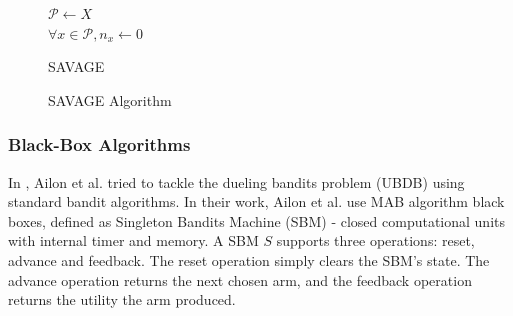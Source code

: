 \documentclass{llncs}
\begin{document}
\begin{figure}[h]
	\IncMargin{1em}
		\begin{algorithm}[H]
		
			$ \mathcal{P} \leftarrow X $\\
			$ \forall x \in \mathcal{P} , n_x \leftarrow 0 $\\
		\BlankLine
			\caption{SAVAGE}
		\end{algorithm}
		\caption{SAVAGE Algorithm}\label{algo_SAVAGE}
	\end{figure}
	\newpage
	
\subsubsection{Black-Box Algorithms}	
	In \cite{??}, Ailon et al. tried to tackle the dueling bandits problem (UBDB) using standard bandit algorithms.
	In their work, Ailon et al. use MAB algorithm black boxes, defined as Singleton Bandits Machine (SBM) - closed computational units with internal timer and memory.
	A SBM $S$ supports three operations: reset, advance and feedback. The reset operation simply clears the SBM's state.
	The advance operation returns the next chosen arm, and the feedback operation returns the utility the arm produced.
\end{document}
